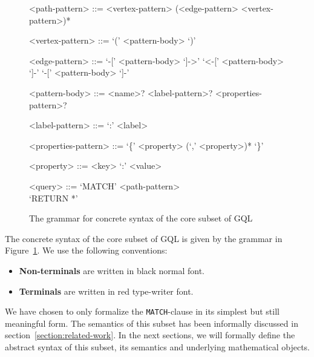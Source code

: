 \documentclass[14pt]{constructor-thesis}
\theoremstyle{definition}
\begin{document}
\begin{figure}
  \newcommand*{\myfont}{\fontfamily{lmss}\selectfont}
  \newcommand*{\myfonttt}{\fontfamily{lmtt}\selectfont}
  \renewcommand{\syntleft}{\myfont\color{black} }
  \renewcommand{\syntright}{}
  \renewcommand{\litleft}{\myfonttt\bfseries\color{red}}
  \renewcommand{\litright}{}
  \setlength{\grammarparsep}{5pt plus 1pt minus 1pt} %
  \setlength{\grammarindent}{10em} %
  \begin{tcolorbox}[colframe=gray!50!white,colback=gray!5!white,arc=0pt]
    \begin{grammar}

      <path-pattern> ::= <vertex-pattern> (<edge-pattern> <vertex-pattern>)*

      <vertex-pattern> ::= `(' <pattern-body> `)'

      <edge-pattern> ::= `-[' <pattern-body> `]->'
      \alt `<-[' <pattern-body> `]-'
      \alt `-[' <pattern-body> `]-'

      <pattern-body> ::= <name>? <label-pattern>? <properties-pattern>?

      <label-pattern> ::= `:' <label>

      <properties-pattern> ::= `\{' <property> (`,' <property>)* `\}'

      <property> ::= <key> `:' <value>

      <query> ::= `MATCH' <path-pattern> \\ `RETURN *'
      
    \end{grammar}
  \end{tcolorbox}
  \caption{The grammar for concrete syntax of the core subset of GQL}
  \label{fig:GQL-grammar}
\end{figure}

The concrete syntax of the core subset of GQL is given by the grammar in Figure~\ref{fig:GQL-grammar}. We use the following conventions:
\begin{itemize}
  \item \textbf{Non-terminals} are written in black normal font.
  \item \textbf{Terminals} are written in red type-writer font.
\end{itemize}

We have chosen to only formalize the \texttt{MATCH}-clause in its simplest but still meaningful form. The semantics of this subset has been informally discussed in section~\ref{section:related-work}. In the next sections, we will formally define the abstract syntax of this subset, its semantics and underlying mathematical objects.
\end{document}
